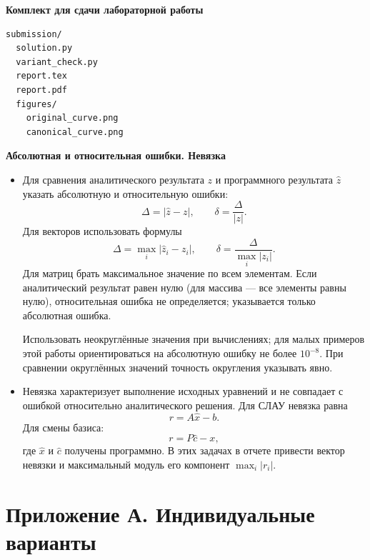 \documentclass[12pt,a4paper]{article}
\newcommand{\taskhead}[1]{\par\textbf{#1}\par}
\begin{document}
\taskhead{Комплект для сдачи лабораторной работы}
\begin{verbatim}
submission/
  solution.py
  variant_check.py
  report.tex
  report.pdf
  figures/
    original_curve.png
    canonical_curve.png
\end{verbatim}

\newpage

\taskhead{Абсолютная и относительная ошибки. Невязка}
\begin{itemize}
\item Для сравнения аналитического результата $z$ и программного результата
$\widehat z$ указать абсолютную и относительную ошибки:
\[
\Delta=|\widehat z-z|,\qquad \delta=\frac{\Delta}{|z|}.
\]
Для векторов использовать формулы
\[
\Delta=\max_i|\widehat z_i-z_i|,\qquad
\delta=\frac{\Delta}{\max_i|z_i|}.
\]
Для матриц брать максимальное значение по всем элементам. Если аналитический результат
равен нулю (для массива --- все элементы равны нулю), относительная ошибка
не определяется; указывается только абсолютная ошибка.

Использовать неокруглённые значения при вычислениях;
для малых примеров этой работы ориентироваться на абсолютную ошибку
не более $10^{-8}$. При сравнении округлённых значений точность округления указывать явно.
\item Невязка характеризует выполнение исходных уравнений и не совпадает
с ошибкой относительно аналитического решения. Для СЛАУ невязка равна
\[
r=A\widehat x-b.
\]
Для смены базиса:
\[
r=P\widehat c-x,
\]
где $\widehat x$ и $\widehat c$ получены программно.
В этих задачах в отчете привести вектор невязки и максимальный модуль его компонент
$\max_i|r_i|$.
\end{itemize}

\clearpage
\section*{Приложение А. Индивидуальные варианты}



\par\ifdim\dimexpr\pagegoal-\pagetotal\relax<140pt\relax\newpage\fi
\end{document}
